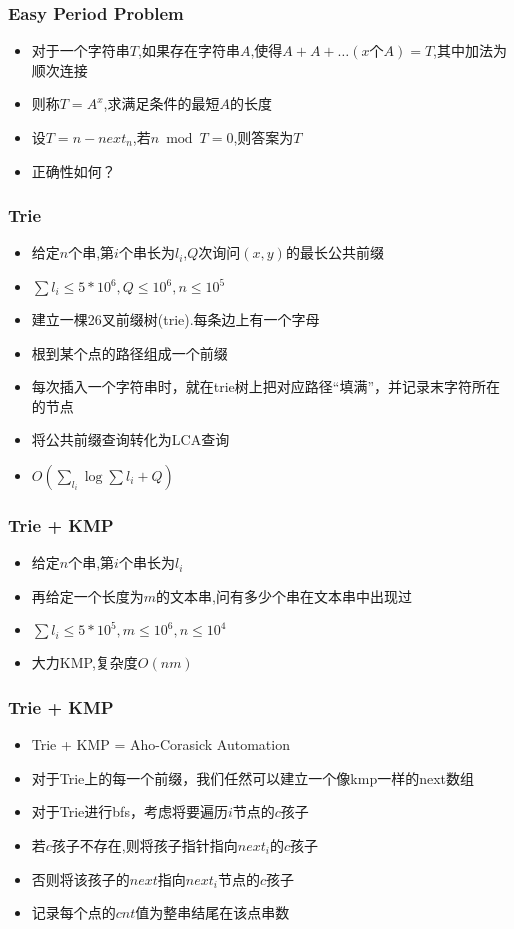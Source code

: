 \documentclass[notheorems]{beamer}
\begin{document}
\begin{frame}
\frametitle{Easy Period Problem}
\begin{itemize}[]
\item 对于一个字符串$T$,如果存在字符串$A$,使得$A+A+\ldots (x个A)= T$,其中加法为顺次连接
\item 则称$T=A^x$,求满足条件的最短$A$的长度
\pause
\item 设$T=n-next_n$,若$n \bmod T = 0$,则答案为$T$
\item 正确性如何？
\end{itemize}
\end{frame}

\begin{frame}
\frametitle{Trie}
\begin{itemize}[]
\item 给定$n$个串,第$i$个串长为$l_i$,$Q$次询问$(x,y)$的最长公共前缀
\item $\sum l_i \leq 5*10^6,Q\leq 10^6,n\leq 10^5$
\pause
\item 建立一棵26叉前缀树(trie).每条边上有一个字母
\item 根到某个点的路径组成一个前缀
\item 每次插入一个字符串时，就在trie树上把对应路径“填满”，并记录末字符所在的节点
\pause
\item 将公共前缀查询转化为LCA查询
\item $O(\sum_{l_i}\log \sum{l_i} + Q)$
\end{itemize}
\end{frame}

\begin{frame}
\frametitle{Trie + KMP}
\begin{itemize}[]
\item 给定$n$个串,第$i$个串长为$l_i$
\item 再给定一个长度为$m$的文本串,问有多少个串在文本串中出现过
\item $\sum l_i \leq 5*10^5,m\leq 10^6,n\leq 10^4$
\pause
\item 大力KMP,复杂度$O(nm)$
\end{itemize}
\end{frame}

\begin{frame}
\frametitle{Trie + KMP}
\begin{itemize}[]
\item Trie + KMP = Aho-Corasick Automation
\pause
\item 对于Trie上的每一个前缀，我们任然可以建立一个像kmp一样的next数组
\item 对于Trie进行bfs，考虑将要遍历$i$节点的$c$孩子
\pause
\item 若$c$孩子不存在,则将孩子指针指向$next_i$的$c$孩子
\item 否则将该孩子的$next$指向$next_i$节点的$c$孩子
\pause
\item 记录每个点的$cnt$值为整串结尾在该点串数
\end{itemize}
\end{frame}
\end{document}
